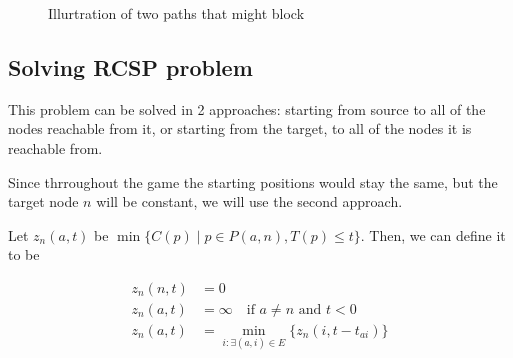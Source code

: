 \documentclass[12pt]{article}
\begin{document}
\begin{figure}[H]\centering
    \caption{Illurtration of two paths that might block}
\end{figure}


\subsection{Solving RCSP problem}

This problem can be solved in 2 approaches:
starting from source to all of the nodes reachable from it,
or starting from the target, to all of the nodes it is reachable from.

Since thrroughout the game the starting positions would stay the same,
but the target node $n$ will be constant, we will use the second approach.

Let $z_n(a, t)$ be $\min \{ C(p) \mid p \in P(a,n), T(p) \leq t \}$.
Then, we can define it to be

\begin{align}
    z_n(n,t) & = 0                                             \\
    z_n(a,t) & = \infty \quad \text{if $a \neq n$ and $t < 0$} \\
    z_n(a,t) & =
    \min\limits_{i : \exists (a,i) \in E}
    \Big\{
    z_n(i, t - t_{ai})
    \Big\}
\end{align}
\end{document}
